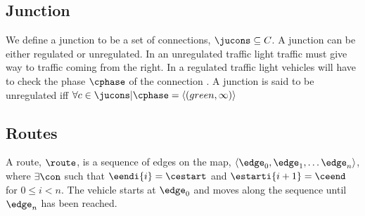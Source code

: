 \subsection{Junction}
We define a junction \ju to be a set of connections, $\jucons \subseteq C$. 
A junction can be either regulated or unregulated. 
In an unregulated traffic light traffic must give way to traffic coming from the right. 
In a regulated traffic light vehicles will have to check the phase $\cphase$ of the connection \vehpos. 
A junction is said to be unregulated iff $\forall c \in \jucons | \cphase = \langle(green, \infty)\rangle$

\subsection{Routes}
A route, $\route$, is a sequence of edges on the map, $\langle \edge_0, \edge_1, \dots \edge_n \rangle$, where $\exists \con$ such that $\eendi{i} = \cestart$ and $\estarti{i+1} = \ceend$ for $0\leq i< n$.
The vehicle starts at $\edge_0$ and moves along the sequence until $\edge_n$ has been reached.





